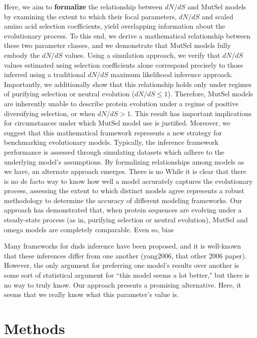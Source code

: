 \documentclass[11pt]{article}
\begin{document}
Here, we aim to \textbf{formalize} the relationship between $dN/dS$ and MutSel models by examining the extent to which their focal parameters, $dN/dS$ and scaled amino acid selection coefficients, yield overlapping information about the evolutionary process. To this end, we derive a mathematical relationship between these two parameter classes, and we demonstrate that MutSel models fully embody the $dN/dS$ values. Using a simulation approach, we verify that $dN/dS$ values estimated using selection coefficients alone correspond precisely to those inferred using a traditional $dN/dS$ maximum likelihood inference approach.  Importantly, we additionally show that this relationship holds only under regimes of purifying selection or neutral evolution ($dN/dS \leq 1$). Therefore, MutSel models are inherently unable to describe protein evolution under a regime of positive diversifying selection, or when $dN/dS > 1$. This result has important implications for circumstances under which MutSel model use is justified.
Moreover, we suggest that this mathematical framework represents a new strategy for benchmarking evolutionary models. Typically, the inference framework performance is assessed through simulating datasets which adhere to the underlying model's assumptions. By formalizing relationships among models as we have, an alternate approach emerges. There is no 
While it is clear that there is no de facto way to know how well a model accurately captures the evolutionary process, assessing the extent to which distinct models agree represents a robust methodology to determine the accuracy of different modeling frameworks. Our approach has demonstrated that, when protein sequences are evolving under a steady-state process (as in, purifying selection or neutral evolution), MutSel and omega models are completely comparable. Even so, bias 


Many frameworks for dnds inference have been proposed, and it is well-known that these inferences differ from one another (yang2006, that other 2006 paper). However, the only argument for preferring one model's results over another is some sort of statistical argument for ``this model seems a lot better," but there is no way to truly know. 
Our approach presents a promising alternative. Here, it seems that we really know what this parameter's value is. 


\section*{Methods}
\end{document}

